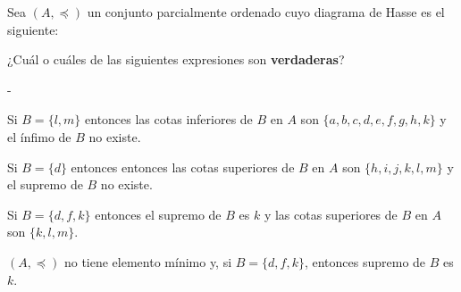\documentclass[12pt, a4paper]{exam}
\makeatletter
\renewenvironment{checkboxes}%
   {\setcounter{choice}{0}\list{\checkbox@char}%
      {%
        \settowidth{\leftmargin}{W.\hskip\labelsep\hskip 2.5em}%
        \def\choice{%
          \if@correctchoice
            \color@endgroup \endgroup
          \fi
          \stepcounter{choice}
          \item[\checked@char]
          \do@choice@pageinfo
        } %
        \def\CorrectChoice{%
          \if@correctchoice
            \color@endgroup \endgroup
          \fi
          \ifprintanswers
            \ifhmode \unskip\unskip\unvbox\voidb@x \fi
            \begingroup \color@begingroup \@correctchoicetrue
            \CorrectChoice@Emphasis
            \stepcounter{choice}
            \item[\checked@char]
          \else
            \stepcounter{choice}
            \item[\checked@char]
          \fi
          \do@choice@pageinfo
        } %
        \let\correctchoice\CorrectChoice
        \labelwidth\leftmargin\advance\labelwidth-\labelsep
        \topsep=0pt
        \partopsep=0pt
        \checkboxeshook
      }%
   }%
   {\if@correctchoice \color@endgroup \endgroup \fi \endlist}
\makeatother
\begin{document}
\begin{questions}
        \question
        {
            Sea $(A, \preceq)$ un conjunto parcialmente ordenado cuyo diagrama
            de Hasse es el siguiente:
            \begin{center}
            \end{center}

            ¿Cuál o cuáles de las siguientes expresiones son 
            \textbf{verdaderas}?
        }
        \begin{checkboxes}
            \choice Si $B = \{l,m\}$ entonces las cotas inferiores de $B$ en $A$ son 
            $\{a,b,c,d,e,f,g,h,k\}$ y el ínfimo de $B$ no existe. 

            \choice Si $B = \{d\}$ entonces entonces las cotas superiores de $B$ 
            en $A$ son $\{h,i,j,k,l,m\}$ y el supremo de $B$ no existe. 

            \choice Si $B = \{d,f,k\}$ entonces el supremo de $B$ es 
            $k$ y las cotas superiores de $B$ en $A$ son $\{k,l,m\}$. %

            \choice  $(A, \preceq)$ no tiene elemento mínimo y, si $B = \{d,f,k\}$, entonces supremo de $B$ es $k$. %
            

\end{checkboxes}
\end{questions}
\end{document}
